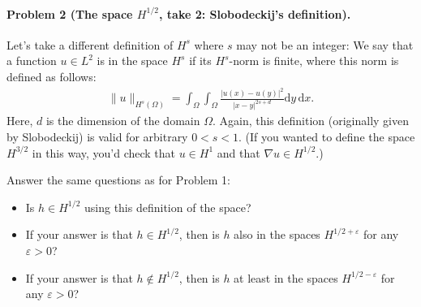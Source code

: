 \documentclass[leqno]{article}
\theoremstyle{nonumberplain}
\begin{document}
\paragraph{Problem 2 (The space $H^{1/2}$, take 2: Slobodeckij's definition).}
Let's take a different definition of $H^{s}$ where $s$ may not be an
integer: We say that a function $u\in L^2$ is in the space $H^{s}$ if
its $H^{s}$-norm is finite, where this norm is defined as follows:
\begin{align*}
  \|u\|_{H^s(\Omega)} = \int_\Omega \int_\Omega
  \frac{|u(x)-u(y)|^2}{|x-y|^{2s+d}} \text{d}y \, \text{d}x.
\end{align*}
Here, $d$ is the dimension of the domain $\Omega$. Again, this
definition (originally given by Slobodeckij) is valid for arbitrary
$0<s<1$. (If you wanted to define the space $H^{3/2}$ in this way,
you'd check that $u\in H^1$ and that $\nabla u\in H^{1/2}$.)

Answer the same questions as for Problem 1:
\begin{itemize}
  \item Is $h\in H^{1/2}$ using this definition of the space?
  \item If your answer is that $h\in H^{1/2}$, then is $h$ also in the
    spaces $H^{1/2+\varepsilon}$ for any $\varepsilon>0$?
  \item If your answer is that $h\not\in H^{1/2}$, then is $h$ at
    least in the spaces $H^{1/2-\varepsilon}$ for any $\varepsilon>0$?
\end{itemize}
\end{document}
